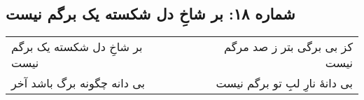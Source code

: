 \begin{center}
\section*{شماره ۱۸: بر شاخِ دل شکسته یک برگم نیست}
\label{sec:018}
\begin{longtable}{l p{0.5cm} r}
بر شاخِ دل شکسته یک برگم نیست
&&
کز بی برگی بتر ز صد مرگم نیست
\\
بی دانه چگونه برگ باشد آخر
&&
بی دانهٔ نارِ لبِ تو برگم نیست
\\
\end{longtable}
\end{center}
